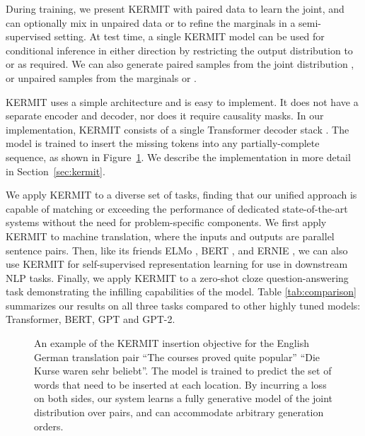 \documentclass{article}
\begin{document}
During training, we present KERMIT with paired data  to learn the joint, and can optionally mix in unpaired data  or  to refine the marginals in a semi-supervised setting. At test time, a single KERMIT model can be used for conditional inference in either direction by restricting the output distribution to  or  as required. We can also generate paired samples from the joint distribution , or unpaired samples from the marginals  or .

KERMIT uses a simple architecture and is easy to implement. It does not have a separate encoder and decoder, nor does it require causality masks. In our implementation, KERMIT consists of a single Transformer decoder stack \citep{vaswani-nips-2017}. The model is trained to insert the missing tokens into any partially-complete sequence, as shown in Figure~\ref{fig:insertion-objective}. We describe the implementation in more detail in Section~\ref{sec:kermit}.

We apply KERMIT to a diverse set of tasks, finding that our unified approach is capable of matching or exceeding the performance of dedicated state-of-the-art systems without the need for problem-specific components. We first apply KERMIT to machine translation, where the inputs and outputs are parallel sentence pairs.
Then, like its friends ELMo \citep{peters-arxiv-2018}, BERT \citep{devlin-naacl-2019}, and ERNIE \citep{sun-arxiv-2019}, we can also use KERMIT for self-supervised representation learning for use in downstream NLP tasks.
Finally, we apply KERMIT to a zero-shot cloze question-answering task demonstrating the infilling capabilities of the model.
Table \ref{tab:comparison} summarizes our results on all three tasks compared to other highly tuned models: Transformer, BERT, GPT and GPT-2.




\begin{figure}[t]
\small
\centering
{}
\caption{An example of the KERMIT insertion objective for the English  German translation pair ``The courses proved quite popular''  ``Die Kurse waren sehr beliebt''. The model is trained to predict the set of words that need to be inserted at each location. By incurring a loss on both sides, our system learns a fully generative model of the joint distribution over  pairs, and can accommodate arbitrary generation orders.}
\label{fig:insertion-objective}
\end{figure}
\end{document}
